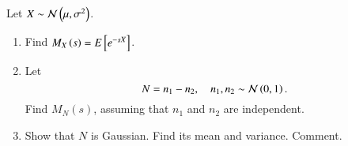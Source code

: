 Let $X \sim \mathcal{N}\left(\mu,\sigma^2\right)$.

\begin{enumerate}[label=\thesection.\arabic*.,ref=\thesection.\theenumi]
\item
Find $M_{X}\left(s\right) = E{}\left[e^{-sX}\right]$.

%
\item
Let 
%
\begin{equation}
N = n_1 - n_2, \quad   n_1,n_2 \sim \mathcal{N}\left(0,1\right).
\end{equation}
%
Find $M_{N}(s)$, assuming that $n_1$ and $n_2$ are independent.

%
\item
Show that $N$ is Gaussian. Find its mean and variance.  Comment.

%
\end{enumerate}
